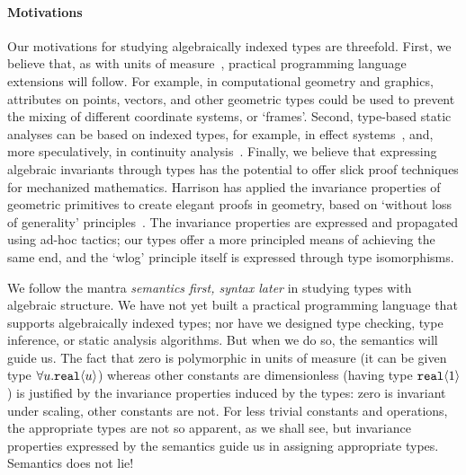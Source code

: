 \paragraph{Motivations}
Our motivations for studying algebraically indexed types are
threefold. First, we believe that, as with
units of measure~\cite{fsharp}, practical programming language
extensions will follow. For example, in computational geometry and
graphics, attributes on points, vectors, and other geometric types
could be used to prevent the mixing of different coordinate systems,
or `frames'. Second, type-based static analyses can be based on
indexed types, for example, in effect systems~\cite{benton06reading},
and, more speculatively, in continuity
analysis~\cite{chaudhuri10continuity}.  Finally, we believe that
expressing algebraic invariants through types has the potential to
offer slick proof techniques for mechanized
mathematics. Harrison has applied the
invariance properties of geometric primitives to create elegant proofs
in geometry, based on `without loss of
generality' principles~\cite{harrison09without}. The invariance properties are expressed 
and propagated using ad-hoc tactics; our types offer a more principled
means of achieving the same end, and the `wlog' principle itself
is expressed through type isomorphisms.

We follow the mantra \emph{semantics first, syntax later} in studying
types with algebraic structure. We have not yet built a practical
programming language that supports algebraically indexed types; nor
have we designed type checking, type inference, or static analysis
algorithms.  But when we do so, the semantics will guide us. The fact
that zero is polymorphic in units of measure (it can be given type $\forall
u.\textup{\texttt{real}}\langle u \rangle$) whereas other constants are dimensionless (having
type $\textup{\texttt{real}}\langle 1 \rangle$) is justified by the invariance properties
induced by the types: zero is invariant under scaling, other constants
are not. For less trivial constants and operations, the appropriate types are
not so apparent, as we shall see, but invariance properties expressed by
the semantics guide us in assigning appropriate types. Semantics does not lie!



